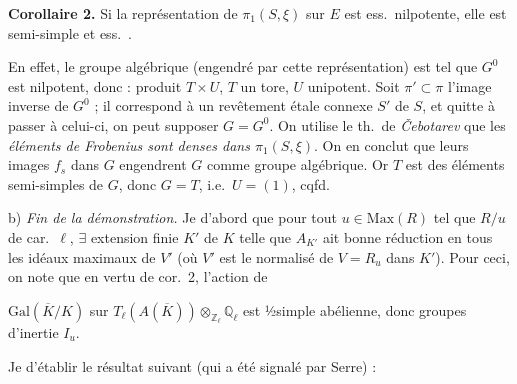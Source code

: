 \documentclass[11pt,a4paper]{article}
\begin{document}
\textbf{Corollaire 2.} Si la représentation de $\pi_1(S,\xi)$ sur $E$ est ess.\ nilpotente, elle est  semi-simple et ess.\ .

En effet, le groupe  algébrique (engendré par cette représentation) est tel que $G^0$ est nilpotent,  \struck{\ill{}} donc : produit $T \times U$, $T$ un tore, $U$ unipotent.  Soit $\pi' \subset \pi$ l'image inverse de $G^0$ ; il correspond à un revêtement  étale connexe $S'$ de $S$, et quitte à passer à celui-ci, on peut supposer $G = G^0$. On utilise le th.\ de \emph{Čebotarev} \struck{\ill{}} que les \emph{éléments de Frobenius sont denses dans $\pi_1(S,\xi)$}. On en conclut que leurs images $f_s$ dans $G$ engendrent $G$ comme groupe algébrique. Or $T$ est  \ill{} des éléments semi-simples de $G$, donc $G = T$, i.e.\ $U = (1)$, cqfd.

b) \emph{Fin de la démonstration.} Je  d'abord que \struck{\ill{}} pour tout $u \in \mathrm{Max}(R)$ tel que $R/u$  de car.~$\ell$, $\exists$ extension finie $K'$ de $K$ telle que $A_{K'}$ ait bonne réduction en tous les idéaux maximaux de $V'$ (où $V'$ est le normalisé de $V = R_u$ dans $K'$). Pour ceci,  on note que \struck{\ill{}} en vertu de cor.~2, l'action de

$\mathrm{Gal}(\overline{K}/K)$ sur $T_\ell(A(\overline{K})) \otimes_{\mathbb{Z}_\ell} \mathbb{Q}_\ell$ est ½simple abélienne, donc  \ill{}  groupes d'inertie $I_u$.


Je  d'établir le résultat suivant (qui a été signalé par Serre) :
\end{document}
